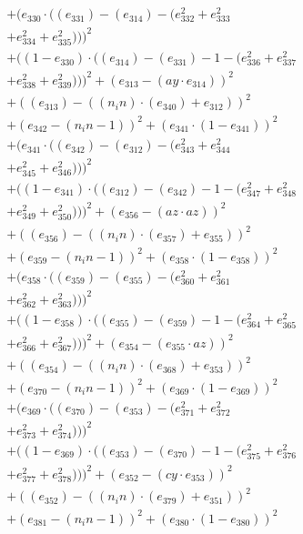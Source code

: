 \documentclass[10pt, a4paper]{article}
\begin{document}
\begin{align*}
& + (e_{330}  \cdot  ((e_{331}) - (e_{314}) - (e_{332}^{2} + e_{333}^{2} \\
& + e_{334}^{2} + e_{335}^{2})))^{2} \\
& + ((1 - e_{330})  \cdot  ((e_{314}) - (e_{331}) - 1 - (e_{336}^{2} + e_{337}^{2} \\
& + e_{338}^{2} + e_{339}^{2})))^{2} + (e_{313} - (ay  \cdot  e_{314}))^{2} \\
& + ((e_{313}) - ((n_in)  \cdot  (e_{340}) + e_{312}))^{2} \\
& + (e_{342} - (n_in - 1))^{2} + (e_{341}  \cdot  (1 - e_{341}))^{2} \\
& + (e_{341}  \cdot  ((e_{342}) - (e_{312}) - (e_{343}^{2} + e_{344}^{2} \\
& + e_{345}^{2} + e_{346}^{2})))^{2} \\
& + ((1 - e_{341})  \cdot  ((e_{312}) - (e_{342}) - 1 - (e_{347}^{2} + e_{348}^{2} \\
& + e_{349}^{2} + e_{350}^{2})))^{2} + (e_{356} - (az  \cdot  az))^{2} \\
& + ((e_{356}) - ((n_in)  \cdot  (e_{357}) + e_{355}))^{2} \\
& + (e_{359} - (n_in - 1))^{2} + (e_{358}  \cdot  (1 - e_{358}))^{2} \\
& + (e_{358}  \cdot  ((e_{359}) - (e_{355}) - (e_{360}^{2} + e_{361}^{2} \\
& + e_{362}^{2} + e_{363}^{2})))^{2} \\
& + ((1 - e_{358})  \cdot  ((e_{355}) - (e_{359}) - 1 - (e_{364}^{2} + e_{365}^{2} \\
& + e_{366}^{2} + e_{367}^{2})))^{2} + (e_{354} - (e_{355}  \cdot  az))^{2} \\
& + ((e_{354}) - ((n_in)  \cdot  (e_{368}) + e_{353}))^{2} \\
& + (e_{370} - (n_in - 1))^{2} + (e_{369}  \cdot  (1 - e_{369}))^{2} \\
& + (e_{369}  \cdot  ((e_{370}) - (e_{353}) - (e_{371}^{2} + e_{372}^{2} \\
& + e_{373}^{2} + e_{374}^{2})))^{2} \\
& + ((1 - e_{369})  \cdot  ((e_{353}) - (e_{370}) - 1 - (e_{375}^{2} + e_{376}^{2} \\
& + e_{377}^{2} + e_{378}^{2})))^{2} + (e_{352} - (cy  \cdot  e_{353}))^{2} \\
& + ((e_{352}) - ((n_in)  \cdot  (e_{379}) + e_{351}))^{2} \\
& + (e_{381} - (n_in - 1))^{2} + (e_{380}  \cdot  (1 - e_{380}))^{2} \\

\end{align*}
\end{document}
